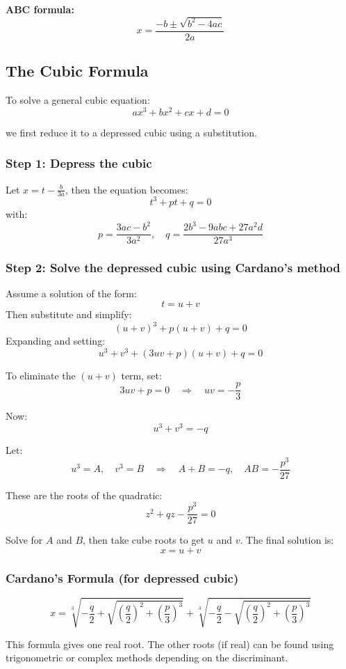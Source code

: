 \textbf{ABC formula:}
\[
x = \frac{-b \pm \sqrt{b^2 - 4ac}}{2a}
\]

\subsection{The Cubic Formula}

To solve a general cubic equation:
\[
ax^3 + bx^2 + cx + d = 0
\]

we first reduce it to a depressed cubic using a substitution.

\subsubsection*{Step 1: Depress the cubic}

Let $x = t - \frac{b}{3a}$, then the equation becomes:
\[
t^3 + pt + q = 0
\]
with:
\[
p = \frac{3ac - b^2}{3a^2}, \quad q = \frac{2b^3 - 9abc + 27a^2d}{27a^3}
\]

\subsubsection*{Step 2: Solve the depressed cubic using Cardano’s method}

Assume a solution of the form:
\[
t = u + v
\]
Then substitute and simplify:
\[
(u+v)^3 + p(u+v) + q = 0
\]
Expanding and setting:
\[
u^3 + v^3 + (3uv + p)(u+v) + q = 0
\]

To eliminate the $(u+v)$ term, set:
\[
3uv + p = 0 \quad \Rightarrow \quad uv = -\frac{p}{3}
\]

Now:
\[
u^3 + v^3 = -q
\]

Let:
\[
u^3 = A, \quad v^3 = B \quad \Rightarrow \quad A + B = -q, \quad AB = -\frac{p^3}{27}
\]

These are the roots of the quadratic:
\[
z^2 + qz - \frac{p^3}{27} = 0
\]

Solve for $A$ and $B$, then take cube roots to get $u$ and $v$. The final solution is:
\[
x = u + v
\]

\subsubsection*{Cardano’s Formula (for depressed cubic)}
\[
x = \sqrt[3]{-\frac{q}{2} + \sqrt{\left(\frac{q}{2}\right)^2 + \left(\frac{p}{3}\right)^3}} + \sqrt[3]{-\frac{q}{2} - \sqrt{\left(\frac{q}{2}\right)^2 + \left(\frac{p}{3}\right)^3}}
\]

This formula gives one real root. The other roots (if real) can be found using trigonometric or complex methods depending on the discriminant.

\newpage
